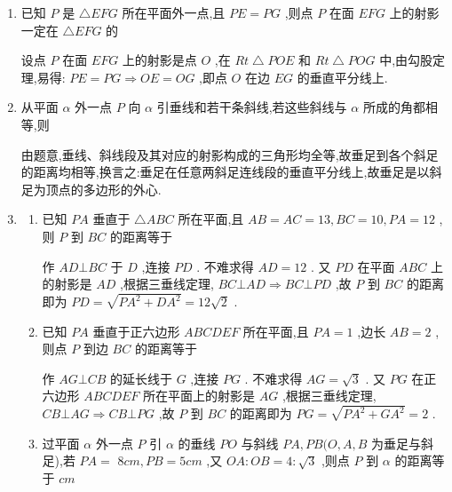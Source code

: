 \begin{enumerate}
      \item 已知 $P$ 是 $\bigtriangleup {EFG}$ 所在平面外一点,且 ${PE} = {PG}$ ,则点 $P$ 在面 ${EFG}$ 上的射影一定在 $\bigtriangleup  {EFG}$ 的
      \begin{jieda}
          设点 $P$ 在面 ${EFG}$ 上的射影是点 $O$ ,在 ${{Rt}} \bigtriangleup  {POE}$ 和 ${{Rt}} \bigtriangleup  {POG}$ 中,由勾股定理,易得: ${PE} = {PG} \Longrightarrow  {OE} = {OG}$ ,即点 $O$ 在边 ${EG}$ 的垂直平分线上.
      \end{jieda}
      
      \item 从平面 $\alpha$ 外一点 $P$ 向 $\alpha$ 引垂线和若干条斜线,若这些斜线与 $\alpha$ 所成的角都相等,则
      \begin{jieda}
          由题意,垂线、斜线段及其对应的射影构成的三角形均全等,故垂足到各个斜足的距离均相等,换言之:垂足在任意两斜足连线段的垂直平分线上,故垂足是以斜足为顶点的多边形的外心.
      \end{jieda}
      \item \begin{enumerate}
          \item 已知 ${PA}$ 垂直于 $\bigtriangleup  {ABC}$ 所在平面,且 ${AB} = {AC} = {13},{BC} = {10},{PA} = {12}$ ,则 $P$ 到 ${BC}$ 的距离等于
          \begin{jieda}
              作 ${AD}\bot {BC}$ 于 $D$ ,连接 ${PD}$ . 不难求得 ${AD} = {12}$ . 又 ${PD}$ 在平面 ${ABC}$ 上的射影是 ${AD}$ ,根据三垂线定理, ${BC} \bot  {AD} \Longrightarrow  {BC} \bot  {PD}$ ,故 $P$ 到 ${BC}$ 的距离即为 ${PD} = \sqrt{P{A}^{2} + D{A}^{2}} = {12}\sqrt{2}$ .
          \end{jieda}
          \item 已知 ${PA}$ 垂直于正六边形 ${ABCDEF}$ 所在平面,且 ${PA} = 1$ ,边长 ${AB} = 2$ ,则点 $P$ 到边 ${BC}$ 的距离等于
          \begin{jieda}
              作 ${AG} \bot  {CB}$ 的延长线于 $G$ ,连接 ${PG}$ . 不难求得 ${AG} = \sqrt{3}$ . 又 ${PG}$ 在正六边形 ${ABCDEF}$ 所在平面上的射影是 ${AG}$ ,根据三垂线定理, ${CB} \bot  {AG} \Longrightarrow  {CB} \bot  {PG}$ ,故 $P$ 到 ${BC}$ 的距离即为 ${PG} = \sqrt{P{A}^{2} + G{A}^{2}} = 2$ .
          \end{jieda}
          \item 过平面 $\alpha$ 外一点 $P$ 引 $\alpha$ 的垂线 ${PO}$ 与斜线 ${PA},{PB}(O,A,B$ 为垂足与斜足),若 ${PA} =$  $8{{cm}},{PB} = 5{{cm}}$ ,又 ${OA} : {OB} = 4 : \sqrt{3}$ ,则点 $P$ 到 $\alpha$ 的距离等于 ${{cm}}$

\end{enumerate}
\end{enumerate}
